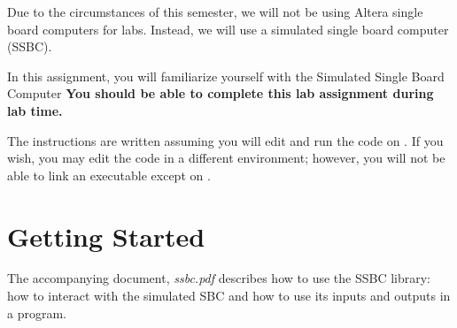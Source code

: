 


\usepackage{enumitem}
\usepackage{graphicx}
\usepackage{media9}
\usepackage{addfont}

\renewcommand{\labnumber}{\ssbcwarmupnumber}
\renewcommand{\labname}{Familiarization with Simulated Hardware}
\renewcommand{\shortlabname}{ssbclab-warmup}
\renewcommand{\collaborationrules}{\ssbcwarmupcollaboration}
\renewcommand{\duedate}{\ssbcwarmupdue}
\pagelayout

\labidentifier


Due to the circumstances of this semester, we will not be using Altera
single board computers for labs. Instead, we will use a simulated single
board computer (SSBC).

In this assignment, you will familiarize yourself with the Simulated Single Board Computer \textbf{You should be able to complete this
lab assignment during lab time.}

The instructions are written assuming you will edit and run the code on
\runtimeenvironment. If you wish, you may edit the code in a different
environment; however, you will not be able to link an executable except on
\runtimeenvironment.

\section{Getting Started}

The accompanying document, \textit{ssbc.pdf} describes how to use the SSBC
library: how to interact with the simulated SBC and how to use its inputs and
outputs in a program.

